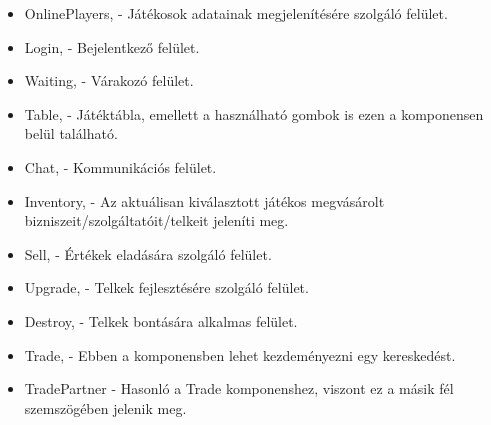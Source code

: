 
\begin{itemize}
	\item OnlinePlayers, - Játékosok adatainak megjelenítésére szolgáló felület.
	\item Login, - Bejelentkező felület.
	\item Waiting, - Várakozó felület.
	\item Table, - Játéktábla, emellett a használható gombok is ezen a komponensen belül található.
	\item Chat, - Kommunikációs felület.
	\item Inventory, - Az aktuálisan kiválasztott játékos megvásárolt bizniszeit/szolgáltatóit/telkeit jeleníti meg.
	\item Sell, - Értékek eladására szolgáló felület.
	\item Upgrade, - Telkek fejlesztésére szolgáló felület.
	\item Destroy, - Telkek bontására alkalmas felület.
	\item Trade, - Ebben a komponensben lehet kezdeményezni egy kereskedést.
	\item TradePartner - Hasonló a Trade komponenshez, viszont ez a másik fél szemszögében jelenik meg.
\end{itemize}
